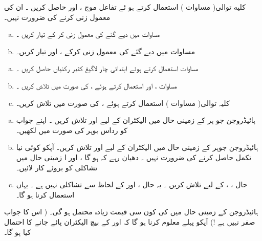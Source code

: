 کلیه توالی( مساوات )  استعمال کرتے ہو ئے  تفاعل موج   ،  اور  حاصل کریں ۔ ان کی معمول زنی کرنے کی   ضرورت نہیں۔ 
\begin{enumerate}[a.]
\item
مساوات    میں دیے گئے  کی معمول زنی کر کے   تیار کریں ۔
\item
مساوات    میں دیے گئے    کی  معمول زنی کرکے    ،   اور    تیار کریں۔ 
\end{enumerate}
\begin{enumerate}[a.]
\item
مساوات   استعمال کرتے ہوئے ابتدائی چار لاگیغ کثیر رکنیاں حاصل کریں ۔
\item
مساوات  ،   اور  استعمال کرتے ہوئے   ،     کی صورت میں   تلاش کریں ۔
\item
کلیہ توالی( مساوات )  استعمال کرتے ہوئے  ،     کی صورت میں   تلاش کریں۔ 
\end{enumerate}
\begin{enumerate}[a.]
\item
ہائیڈروجن جو ہر کے زمینی حال میں الیکٹران   کے لیے   اور  تلاش کریں ۔  اپنے جواب کو رداس بوہر کی صورت میں لکھیں۔ 
\item
ہائیڈروجن جوہر کے زمینی حال میں الیکٹران  کے لیے    اور   تلاش کریں۔    آپکو کوئی نیا تکمل حاصل کرنے کی ضرورت نہیں ۔ دھیان  رہے کہ 
   ہو گا    ، اور ا  زمینی حال میں تشاکلی کو بروئے کار لائیں۔ 
\item
حال  ، ،  کے لیے  تلاش کریں ۔     یہ حال  ،  اور  کے لحاظ سے  تشاکلی نہیں ہے ۔ یہاں
  استعمال کرنا  ہو گا۔ 
\end{enumerate}
ہائیڈروجن کے زمینی حال میں   کی کون سی قیمت زیادہ محتمل ہو گی۔ ( اس کا جواب صفر نہیں ہے !)    آپکو پہلے  معلوم کرنا ہو گا کہ  اور  کے بیچ  الیکٹران  پائے جانے کا احتمال کیا ہو گا۔
